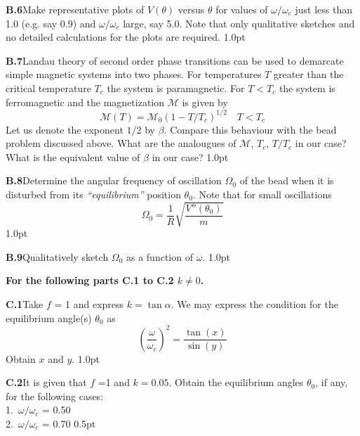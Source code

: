 \textbf{B.6}\quad Make representative plots of $V(\theta)$ versus $\theta$ for
values of $\omega/\omega_c$ just less than 1.0 (e.g. say 0.9) and
$\omega/\omega_c$ large, say 5.0. Note that only qualitative sketches and no
detailed calculations for the plots are required. \hfill 1.0pt

\textbf{B.7}\quad Landau theory of second order phase transitions can be used
to demarcate simple magnetic systems into two phases. For temperatures $T$
greater than the critical temperature $T_c$ the system is paramagnetic. For
$T < T_c$ the system is ferromagnetic and the magnetization $\mathcal{M}$ is
given by
\[
\mathcal{M}(T) = \mathcal{M}_0(1 - T/T_c)^{1/2} \quad T < T_c
\]
Let us denote the exponent $1/2$ by $\beta$. Compare this behaviour with the
bead problem discussed above. What are the analougues of $\mathcal{M}$, $T_c$,
$T/T_c$ in our case? What is the equivalent value of $\beta$ in our case?
\hfill 1.0pt

\textbf{B.8}\quad Determine the angular frequency of oscillation $\Omega_0$ of
the bead when it is disturbed from its \textit{``equilibrium''} position
$\theta_0$. Note that for small oscillations
\[
\Omega_0 = \frac{1}{R}\sqrt{\frac{V''(\theta_0)}{m}}
\]
\hfill 1.0pt

\textbf{B.9}\quad Qualitatively sketch $\Omega_0$ as a function of $\omega$.
\hfill 1.0pt

\textbf{For the following parts C.1 to C.2 $k \neq 0$.}

\textbf{C.1}\quad Take $f$ = 1 and express $k = \tan\alpha$. We may express
the condition for the equilibrium angle(s) $\theta_0$ as
\[
\left(\frac{\omega}{\omega_c}\right)^2 = \frac{\tan(x)}{\sin(y)}
\]
Obtain $x$ and $y$. \hfill 1.0pt

\textbf{C.2}\quad It is given that $f$ =1 and $k = 0.05$. Obtain the
equilibrium angles $\theta_0$, if any, for the following cases:\\
1.\ $\omega/\omega_c$ = 0.50\\
2.\ $\omega/\omega_c$ = 0.70 \hfill 0.5pt
